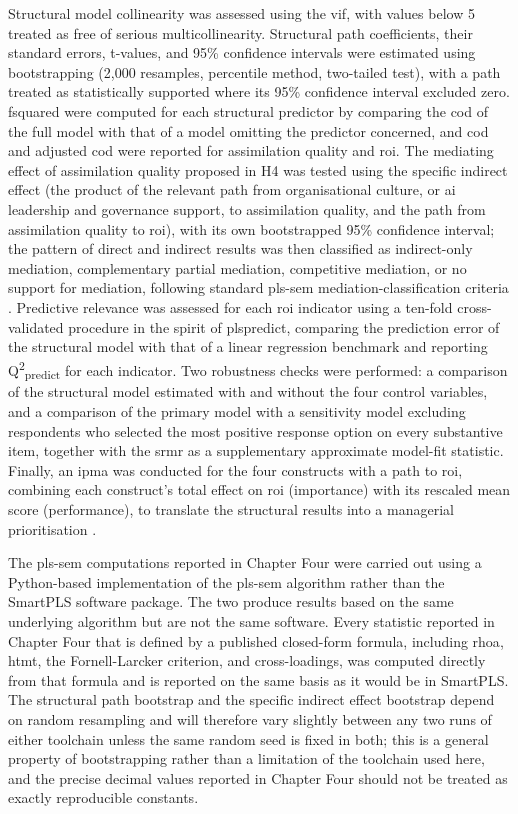 Structural model collinearity was assessed using the \gls{vif}, with values below 5 treated as free of serious multicollinearity. Structural path coefficients, their standard errors, t-values, and 95\% confidence intervals were estimated using bootstrapping (2,000 resamples, percentile method, two-tailed test), with a path treated as statistically supported where its 95\% confidence interval excluded zero. \gls{fsquared} were computed for each structural predictor by comparing the \gls{cod} of the full model with that of a model omitting the predictor concerned, and \gls{cod} and adjusted \gls{cod} were reported for assimilation quality and \gls{roi}. The mediating effect of assimilation quality proposed in H4 was tested using the specific indirect effect (the product of the relevant path from organisational culture, or \gls{ai} leadership and governance support, to assimilation quality, and the path from assimilation quality to \gls{roi}), with its own bootstrapped 95\% confidence interval; the pattern of direct and indirect results was then classified as indirect-only mediation, complementary partial mediation, competitive mediation, or no support for mediation, following standard \gls{pls-sem} mediation-classification criteria \autocite{Hair2019}. Predictive relevance was assessed for each \gls{roi} indicator using a ten-fold cross-validated procedure in the spirit of \gls{plspredict}, comparing the prediction error of the structural model with that of a linear regression benchmark and reporting Q\textsuperscript{2}\textsubscript{predict} for each indicator. Two robustness checks were performed: a comparison of the structural model estimated with and without the four control variables, and a comparison of the primary model with a sensitivity model excluding respondents who selected the most positive response option on every substantive item, together with the \gls{srmr} as a supplementary approximate model-fit statistic. Finally, an \gls{ipma} was conducted for the four constructs with a path to \gls{roi}, combining each construct's total effect on \gls{roi} (importance) with its rescaled mean score (performance), to translate the structural results into a managerial prioritisation \autocite{Hair2019}.

The \gls{pls-sem} computations reported in Chapter Four were carried out using a Python-based implementation of the \gls{pls-sem} algorithm rather than the SmartPLS software package. The two produce results based on the same underlying algorithm but are not the same software. Every statistic reported in Chapter Four that is defined by a published closed-form formula, including \gls{rhoa}, \gls{htmt}, the Fornell-Larcker criterion, and cross-loadings, was computed directly from that formula and is reported on the same basis as it would be in SmartPLS. The structural path bootstrap and the specific indirect effect bootstrap depend on random resampling and will therefore vary slightly between any two runs of either toolchain unless the same random seed is fixed in both; this is a general property of bootstrapping rather than a limitation of the toolchain used here, and the precise decimal values reported in Chapter Four should not be treated as exactly reproducible constants.

